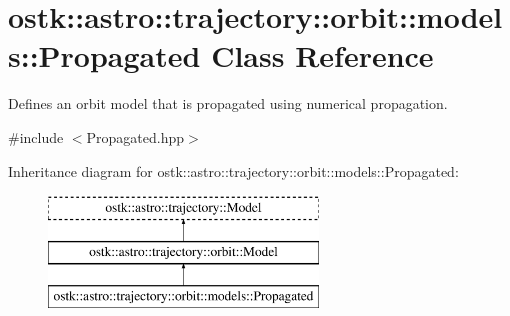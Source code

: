\hypertarget{classostk_1_1astro_1_1trajectory_1_1orbit_1_1models_1_1_propagated}{}\section{ostk\+:\+:astro\+:\+:trajectory\+:\+:orbit\+:\+:models\+:\+:Propagated Class Reference}
\label{classostk_1_1astro_1_1trajectory_1_1orbit_1_1models_1_1_propagated}


Defines an orbit model that is propagated using numerical propagation.  




{\ttfamily \#include $<$Propagated.\+hpp$>$}

Inheritance diagram for ostk\+:\+:astro\+:\+:trajectory\+:\+:orbit\+:\+:models\+:\+:Propagated\+:\begin{figure}[H]
\begin{center}
\leavevmode
\includegraphics[height=3.000000cm]{classostk_1_1astro_1_1trajectory_1_1orbit_1_1models_1_1_propagated}
\end{center}
\end{figure}
